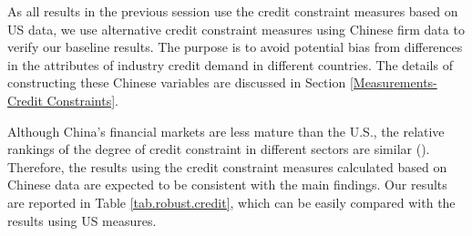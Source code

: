 \documentclass[12pt]{article}
\begin{document}
As all results in the previous session use the credit constraint measures based on US data, we use alternative credit constraint measures using Chinese firm data to verify our baseline results. The purpose is to avoid potential bias from differences in the attributes of industry credit demand in different countries. The details of constructing these Chinese variables are discussed in Section \ref{Measurements-Credit Constraints}. 

Although China's financial markets are less mature than the U.S., the relative rankings of the degree of credit constraint in different sectors are similar (\cite{manova2013}). Therefore, the results using the credit constraint measures calculated based on Chinese data are expected to be consistent with the main findings. Our results are reported in Table \ref{tab.robust.credit}, which can be easily compared with the results using US measures.
\end{document}
